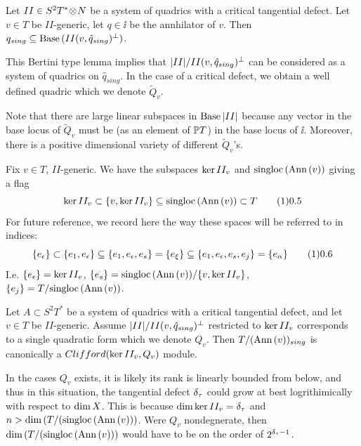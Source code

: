  Let $II\in S^2T^*\!\otimes\! N$
be a system of quadrics with a critical tangential defect. Let
$v\in T$ be $II$-generic,   let $q\in\ii$ be the annhilator of $v$. 
Then $q_{sing}\subseteq\text{Base}\, (II(v,\hat q_{sing}){}^{\perp})$.
\endproclaim

This Bertini type lemma implies
that $| II |/II(v,\hat q_{sing}){}^{\perp}$ can be considered
 as a system of quadrics
on $\hat q_{sing}$. In the case of a critical defect, we obtain
    a well defined quadric which we denote
$\tilde Q_v$.

Note that there are large linear subspaces
in $\text{Base}\, | II |$ because   any
vector in the base locus
of $\tilde Q_v$ must be (as an element of $\Bbb P T$) in the base locus
of
$\ii$.  Moreover,   there is a positive dimensional variety
of different $\tilde Q_v$'s.

  
 Fix $v\in T$, $II$-generic. We have the
subspaces $\text{ker}\, II_v$ and $\text{singloc}\, (\text{Ann}\, (v))$ giving a flag
$$
\tker II_v
\subset\{ v,\tker II_v\}\subseteq \tsingloc (\tann (v))\subset T\tag 10.5 
$$
For future reference, we record here the  way these spaces will
be referred to in indices:
$$
\{\ee\epsilon\}
\subset\{ \ee 1, \ee\epsilon\}\subseteq
\{ \ee 1, \ee\epsilon,\ee s\}=\{\ee\xi\}\subseteq 
\{ \ee 1, \ee\epsilon,\ee s,\ee j\}=\{\ee\alpha\}\tag 10.6
$$
I.e. $\{ e_{\epsilon}\}= \text{ker}\, II_v$,
$\{e_{s}\}=\text{singloc}\, (\text{Ann}\, (v))/\{ v,\text{ker}\, II_v\}$,
$\{e_{j}\} =T/\text{singloc}\, (\text{Ann}\, (v))$. 
 
Let $A\subset S^2T^*$ be a system of quadrics with a critical tangential
defect, and let $v\in T$ be $II$-generic. 
Assume $| II |/II(v, \hat q_{sing}){}^{\perp}$ restricted to $\text{ker}\, II_v$
corresponds to a single quadratic form which we denote $Q_v$. Then
$T/(\text{Ann}\, (v))_{sing}$
is canonically a $Clifford(\text{ker}\, II_v, Q_v)$ module.
\endproclaim

In the cases
 $Q_v$  exists,
it is likely its rank is linearly bounded
from below, and thus in this situation,
the tangential defect $\delta_{\tau}$ could
grow at best logrithimically with respect to $\text{dim}\, X$. This is because
$\text{dim}\,\text{ker}\, II_v=\delta_{\tau}$ and\linebreak
$n>\text{dim}\, (T/(\text{singloc}\, (\text{Ann}\, (v)))$. Were $Q_v$ nondegnerate,
then $\text{dim}\, (T/( \text{singloc}\, (\text{Ann}\, (v)))$ would have to be on the order
of $2^{\delta_{\tau} -1}$.  

  
 

\smallpagebreak

